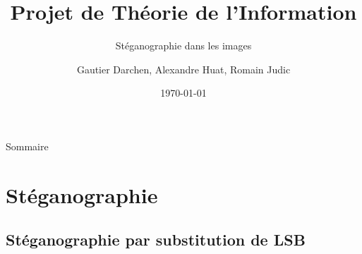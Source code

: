 \documentclass{beamer}
\title[Projet TI]{Projet de Théorie de l'Information}
\subtitle{Stéganographie dans les images}
\author[G. Darchen, A. Huat, R. Judic]{Gautier Darchen, Alexandre Huat, Romain Judic}
\institute[]{INSA Rouen\\ASI4}
\date{\today}
\newif\ifplacelogo
\begin{document}
\placelogotrue	%

	\begin{frame}
	\titlepage
	\end{frame}
	
	\begin{frame}[label=sommaire]{Sommaire}
		\tableofcontents%
	\end{frame}
	
	\section{Stéganographie}	
	
	\subsection{Stéganographie par substitution de LSB}
	
\end{document}

